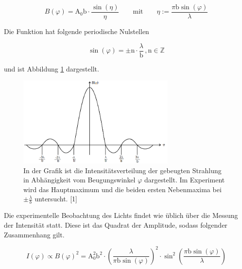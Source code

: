 \documentclass[titlepage = firstcover]{scrartcl}
\begin{document}
            \begin{equation}
                B(\varphi) = \text{A}_0 \text{b} \cdot \frac{\sin(\eta)}{\eta} \qquad \text{mit} \qquad \eta := \frac{\pi \text{b} \sin (\varphi)}{\lambda}
                \label{eqn:Winkelabhängigkeit}
            \end{equation}

            \noindent
            Die Funktion hat folgende periodische Nulstellen
            
            \begin{equation}
                \sin(\varphi) = \pm \text{n} \cdot \frac{\lambda}{\text{b}} \, , \text{n} \in \mathds{Z}
                \label{eqn:NSTEinzel}
            \end{equation}

            \noindent
            und ist Abbildung \ref{fig:BEinzel} dargestellt.

            \FloatBarrier

            \begin{figure}[h]
              \centering
              \includegraphics[width = 0.7\textwidth]{Bilder/BEinzel.png}
              \caption{In der Grafik ist die Intensitätsverteilung der gebeugten Strahlung in Abhängigkeit vom Beugungswinkel $\varphi$ dargestellt. Im Experiment wird das Hauptmaximum und die beiden ersten Nebenmaxima bei $\pm \frac{\lambda}{b}$ untersucht. [1]}
              \label{fig:BEinzel}
            \end{figure}

            \FloatBarrier

            \noindent

            Die experimentelle Beobachtung des Lichts findet wie üblich über die Messung der Intensität statt. Diese ist das Quadrat der Amplitude, sodass folgender Zusammenhang gilt.

            \begin{equation}
                I(\varphi) \propto B(\varphi)^2 = \text{A}_0^2 \text{b}^2 \cdot \left(\frac{\lambda}{\pi \text{b} \sin(\varphi)}\right)^2 \cdot \sin^2 \left(\frac{\pi \text{b} \sin(\varphi)}{\lambda}\right)
                \label{eqn:IEinzel}
            \end{equation}
\end{document}
